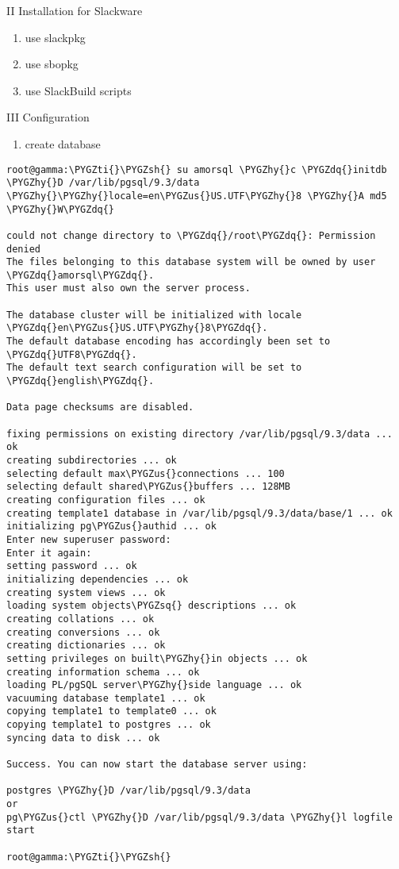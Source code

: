 \documentclass[letterpaper,10pt,english]{sphinxmanual}
\def\PYGZus{\char`\_}
\def\PYGZsh{\char`\#}
\def\PYGZhy{\char`\-}
\def\PYGZsq{\char`\'}
\def\PYGZdq{\char`\"}
\def\PYGZti{\char`\~}
\begin{document}
II Installation for Slackware
\begin{enumerate}
\item {} 
use slackpkg

\item {} 
use sbopkg

\item {} 
use SlackBuild scripts

\end{enumerate}

III Configuration
\begin{enumerate}
\item {} 
create database

\end{enumerate}

\begin{Verbatim}[commandchars=\\\{\}]
root@gamma:\PYGZti{}\PYGZsh{} su amorsql \PYGZhy{}c \PYGZdq{}initdb \PYGZhy{}D /var/lib/pgsql/9.3/data \PYGZhy{}\PYGZhy{}locale=en\PYGZus{}US.UTF\PYGZhy{}8 \PYGZhy{}A md5 \PYGZhy{}W\PYGZdq{} 

could not change directory to \PYGZdq{}/root\PYGZdq{}: Permission denied
The files belonging to this database system will be owned by user \PYGZdq{}amorsql\PYGZdq{}.
This user must also own the server process.

The database cluster will be initialized with locale \PYGZdq{}en\PYGZus{}US.UTF\PYGZhy{}8\PYGZdq{}.
The default database encoding has accordingly been set to \PYGZdq{}UTF8\PYGZdq{}.
The default text search configuration will be set to \PYGZdq{}english\PYGZdq{}.

Data page checksums are disabled.

fixing permissions on existing directory /var/lib/pgsql/9.3/data ... ok
creating subdirectories ... ok
selecting default max\PYGZus{}connections ... 100
selecting default shared\PYGZus{}buffers ... 128MB
creating configuration files ... ok
creating template1 database in /var/lib/pgsql/9.3/data/base/1 ... ok
initializing pg\PYGZus{}authid ... ok
Enter new superuser password: 
Enter it again: 
setting password ... ok
initializing dependencies ... ok
creating system views ... ok
loading system objects\PYGZsq{} descriptions ... ok
creating collations ... ok
creating conversions ... ok
creating dictionaries ... ok
setting privileges on built\PYGZhy{}in objects ... ok
creating information schema ... ok
loading PL/pgSQL server\PYGZhy{}side language ... ok
vacuuming database template1 ... ok
copying template1 to template0 ... ok
copying template1 to postgres ... ok
syncing data to disk ... ok

Success. You can now start the database server using:

postgres \PYGZhy{}D /var/lib/pgsql/9.3/data
or
pg\PYGZus{}ctl \PYGZhy{}D /var/lib/pgsql/9.3/data \PYGZhy{}l logfile start

root@gamma:\PYGZti{}\PYGZsh{}
\end{Verbatim}
\end{document}
